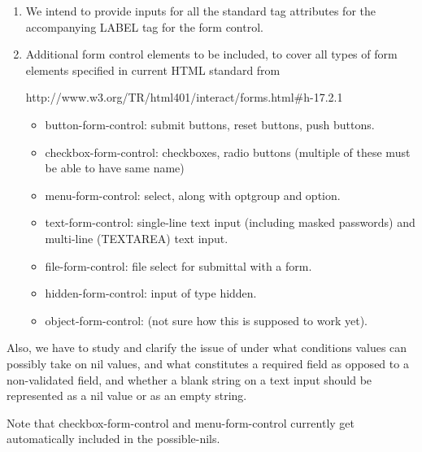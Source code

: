 \documentclass [11pt]{book}
\begin{document}
\begin{itemize}
\begin{description}
\begin{enumerate}
\item 
We intend to provide inputs for all the standard tag attributes for the accompanying LABEL tag for the form control.



\item 
Additional form control elements to be included, to cover all types of form elements specified in current HTML standard from

    http://www.w3.org/TR/html401/interact/forms.html\#h-17.2.1

    

\begin{itemize}

\item button-form-control: submit buttons, reset buttons, push buttons.
      

\item checkbox-form-control: checkboxes, radio buttons (multiple of these must be able to have same name)
      

\item menu-form-control: select, along with optgroup and option.
      

\item text-form-control: single-line text input (including masked passwords) and multi-line (TEXTAREA) text input.
      

\item file-form-control: file select for submittal with a form.
      

\item hidden-form-control: input of type hidden.
      

\item object-form-control: (not sure how this is supposed to work yet).
    

\end{itemize}



\end{enumerate}




Also, we have to study and clarify the issue of under what conditions values can possibly take on nil values, 
and what constitutes a required field as opposed to a non-validated field, and whether a blank string on a text
input should be represented as a nil value or as an empty string.

Note that checkbox-form-control and menu-form-control currently get automatically included in the possible-nils.







\end{description}
\end{itemize}
\end{document}
